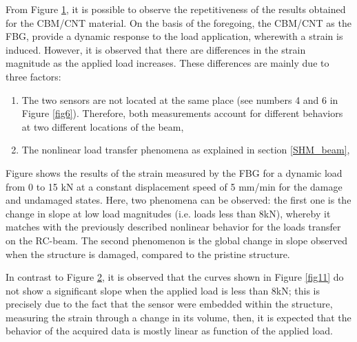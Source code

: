 \documentclass[twocolumn]{bmcart}%
\begin{document}
From Figure \ref{fig12}, it is possible to observe the repetitiveness of the results obtained for the CBM/CNT material. On the basis of the foregoing, the CBM/CNT as the FBG, provide a dynamic response to the load application, wherewith a strain is induced. However, it is observed that there are differences in the strain magnitude as the applied load increases. These differences are mainly due to three factors: 

\begin{enumerate}

 \item  The two sensors are not located at the same place (see numbers 4 and 6 in Figure \ref{fig6}). Therefore, both measurements account for different behaviors at two different locations of the beam,

 \item  The nonlinear load transfer phenomena as explained in section \ref{SHM_beam}, 


\end{enumerate}

\begin{figure}[h!]
  \caption{
      }
      \label{fig12}
      \end{figure}

Figure  shows the results of the strain measured by the FBG for a dynamic load from 0 to 15 kN at a constant displacement speed of 5 mm/min for the damage and undamaged states. Here, two phenomena can be observed: the first one is the change in slope at low load magnitudes (i.e. loads less than 8kN), whereby it matches with the previously described nonlinear behavior for the loads transfer on the RC-beam. The second phenomenon is the global change in slope observed when the structure is damaged, compared to the pristine structure. 

\begin{figure}[h!]
  \caption{
      }
      \label{fig13}
      \end{figure}

In contrast to Figure \ref{fig13}, it is observed that the curves shown in Figure \ref{fig11} do not show a significant slope when the applied load is less than 8kN; this is precisely due to the fact that the sensor were embedded within the structure, measuring the strain through a change in its volume, then, it is expected that the behavior of the acquired data is mostly linear as function of the applied load.
\end{document}
